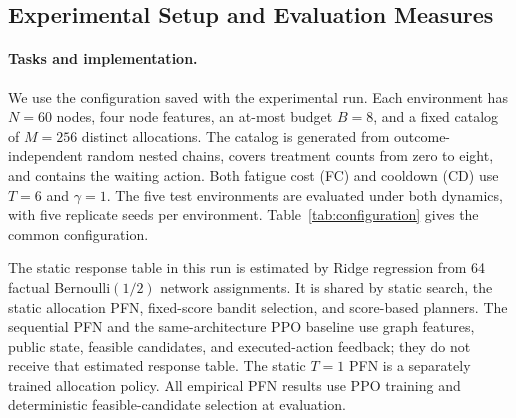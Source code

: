 \documentclass[a4paper,11pt]{article}
\numberwithin{equation}{section}
\begin{document}
\subsection{Experimental Setup and Evaluation Measures}
\label{sec:experimental-setup}
\paragraph{Tasks and implementation.}
We use the configuration saved with the experimental run. Each environment has $N=60$ nodes, four node features, an at-most budget $B=8$, and a fixed catalog of $M=256$ distinct allocations. The catalog is generated from outcome-independent random nested chains, covers treatment counts from zero to eight, and contains the waiting action. Both fatigue cost (FC) and cooldown (CD) use $T=6$ and $\gamma=1$. The five test environments are evaluated under both dynamics, with five replicate seeds per environment. Table~\ref{tab:configuration} gives the common configuration.

The static response table in this run is estimated by Ridge regression from 64 factual Bernoulli$(1/2)$ network assignments. It is shared by static search, the static allocation PFN, fixed-score bandit selection, and score-based planners. The sequential PFN and the same-architecture PPO baseline use graph features, public state, feasible candidates, and executed-action feedback; they do not receive that estimated response table. The static $T=1$ PFN is a separately trained allocation policy. All empirical PFN results use PPO training and deterministic feasible-candidate selection at evaluation.
\end{document}
